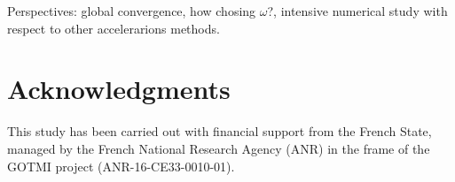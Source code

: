 \documentclass{article} %
\theoremstyle{plain}
\theoremstyle{definition}
\theoremstyle{remark}
\begin{document}
Perspectives:
global convergence, how chosing $\omega$?, intensive numerical study with respect to other accelerarions methods\cite{2016arXiv160604133S,2017arXiv170509634A}.





\section*{Acknowledgments}
This study has been carried out with financial support from the French State, managed by the French National Research Agency (ANR) in the frame of the  GOTMI project (ANR-16-CE33-0010-01).




\end{document}

